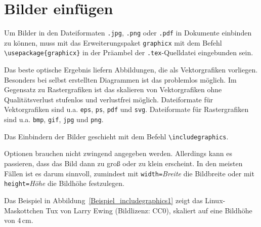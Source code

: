 \documentclass[a4paper,10pt,twoside]{scrbook}
\begin{document}




\chapter{Bilder einfügen}
\label{KapitelBilder}


Um Bilder in den Dateiformaten \verb!.jpg!, \verb!.png! oder \verb!.pdf! in Dokumente einbinden zu können, muss mit das Erweiterungspaket \verb!graphicx! mit dem Befehl \verb!\usepackage{graphicx}! in der Präambel der \verb!.tex!-Quelldatei eingebunden sein.

Das beste optische Ergebnis liefern Abbildungen, die als Vektorgrafiken vorliegen. Besonders bei selbst erstellten Diagrammen ist das problemlos möglich. Im Gegensatz zu Rastergrafiken ist das skalieren von Vektorgrafiken ohne Qualitätsverlust stufenlos und verlustfrei möglich. Dateiformate für Vektorgrafiken sind u.a. \verb!eps!, \verb!ps!, \verb!pdf! und \verb!svg!. Dateiformate für Rastergrafiken sind u.a. \verb!bmp!, \verb!gif!, \verb!jpg! und \verb!png!.

Das Einbindern der Bilder geschieht mit dem Befehl \verb!\includegraphics!.


Optionen brauchen nicht zwingend angegeben werden. Allerdings kann es 
passieren, dass das Bild dann zu groß oder zu
klein erscheint. In den meisten Fällen ist es darum sinnvoll, zumindest mit
\verb!width=!\textsl{Breite} die Bildbreite oder mit 
\verb!height=!\textsl{Höhe} die Bildhöhe festzulegen.



Das Beispiel in Abbildung~\ref{Beispiel_includegraphics1} zeigt das Linux-Maskottchen Tux von Larry Ewing (Bildlizenz: CC0), skaliert auf eine Bildhöhe von 4\,cm.
\end{document}
